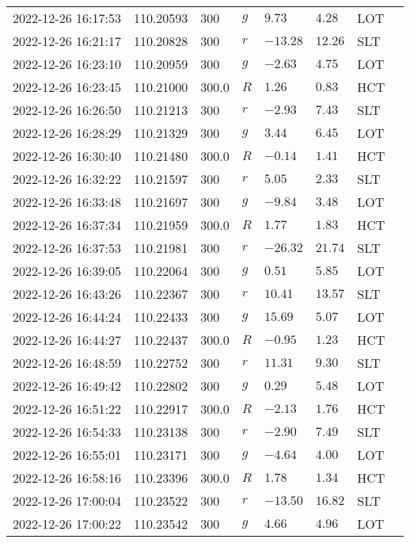 \documentclass{nature_plusfigure}
\begin{document}
\begin{supplement}
\begin{center}
\begin{longtable}{llllllll}
2022-12-26 16:17:53 & 110.20593 & 300 & $g$ & $9.73$ & $4.28$ & LOT &  \\ 
2022-12-26 16:21:17 & 110.20828 & 300 & $r$ & $-13.28$ & $12.26$ & SLT &  \\ 
2022-12-26 16:23:10 & 110.20959 & 300 & $g$ & $-2.63$ & $4.75$ & LOT &  \\ 
2022-12-26 16:23:45 & 110.21000 & 300.0 & $R$ & $1.26$ & $0.83$ & HCT &  \\ 
2022-12-26 16:26:50 & 110.21213 & 300 & $r$ & $-2.93$ & $7.43$ & SLT &  \\ 
2022-12-26 16:28:29 & 110.21329 & 300 & $g$ & $3.44$ & $6.45$ & LOT &  \\ 
2022-12-26 16:30:40 & 110.21480 & 300.0 & $R$ & $-0.14$ & $1.41$ & HCT &  \\ 
2022-12-26 16:32:22 & 110.21597 & 300 & $r$ & $5.05$ & $2.33$ & SLT &  \\ 
2022-12-26 16:33:48 & 110.21697 & 300 & $g$ & $-9.84$ & $3.48$ & LOT &  \\ 
2022-12-26 16:37:34 & 110.21959 & 300.0 & $R$ & $1.77$ & $1.83$ & HCT &  \\ 
2022-12-26 16:37:53 & 110.21981 & 300 & $r$ & $-26.32$ & $21.74$ & SLT &  \\ 
2022-12-26 16:39:05 & 110.22064 & 300 & $g$ & $0.51$ & $5.85$ & LOT &  \\ 
2022-12-26 16:43:26 & 110.22367 & 300 & $r$ & $10.41$ & $13.57$ & SLT &  \\ 
2022-12-26 16:44:24 & 110.22433 & 300 & $g$ & $15.69$ & $5.07$ & LOT &  \\ 
2022-12-26 16:44:27 & 110.22437 & 300.0 & $R$ & $-0.95$ & $1.23$ & HCT &  \\ 
2022-12-26 16:48:59 & 110.22752 & 300 & $r$ & $11.31$ & $9.30$ & SLT &  \\ 
2022-12-26 16:49:42 & 110.22802 & 300 & $g$ & $0.29$ & $5.48$ & LOT &  \\ 
2022-12-26 16:51:22 & 110.22917 & 300.0 & $R$ & $-2.13$ & $1.76$ & HCT &  \\ 
2022-12-26 16:54:33 & 110.23138 & 300 & $r$ & $-2.90$ & $7.49$ & SLT &  \\ 
2022-12-26 16:55:01 & 110.23171 & 300 & $g$ & $-4.64$ & $4.00$ & LOT &  \\ 
2022-12-26 16:58:16 & 110.23396 & 300.0 & $R$ & $1.78$ & $1.34$ & HCT &  \\ 
2022-12-26 17:00:04 & 110.23522 & 300 & $r$ & $-13.50$ & $16.82$ & SLT &  \\ 
2022-12-26 17:00:22 & 110.23542 & 300 & $g$ & $4.66$ & $4.96$ & LOT &  \\ 

\end{longtable}
\end{center}
\end{supplement}
\end{document}
